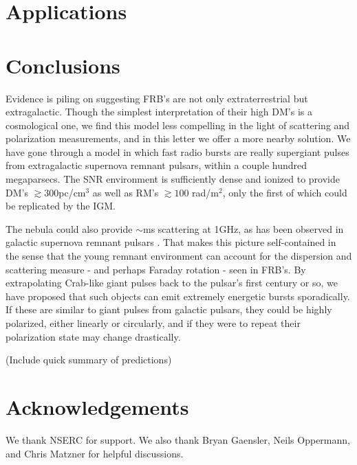 \documentclass[useAMS,usenatbib]{emulateapj}
\begin{document}
\section{Applications}

\section{Conclusions}
Evidence is piling on suggesting FRB's are not only extraterrestrial
but extragalactic. Though the simplest interpretation of their high DM's 
is a cosmological one, we find this model less compelling in the light of 
scattering and polarization measurements, and in this letter we offer a 
more nearby solution. We have gone through
a model in which fast radio bursts are really supergiant pulses from 
extragalactic supernova remnant pulsars, within a couple hundred megaparsecs. 
The SNR environment is sufficiently
dense and ionized to provide DM's $\gtrsim 300$pc/cm$^3$ as well as 
RM's $\gtrsim 100$ rad/m$^2$, only the first of which could be replicated by the IGM. 

The nebula could also provide $\sim$ms scattering at 1GHz, as has been 
observed in galactic supernova remnant pulsars \cite{}. 
That makes this picture self-contained in the sense that
the young remnant environment can account for the dispersion 
and scattering measure - and perhaps Faraday rotation - seen in FRB's. 
By extrapolating Crab-like giant pulses back to the pulsar's first century or so,
we have proposed that such objects can emit extremely energetic bursts sporadically. 
If these are similar to giant pulses from galactic pulsars, they could be highly polarized, 
either linearly or circularly, and if they were to repeat their polarization state may 
change drastically. 

(Include quick summary of predictions)

\section{Acknowledgements}

We thank NSERC for support. We also thank Bryan Gaensler, Neils Oppermann, 
and Chris Matzner for helpful discussions. 

%




\label{lastpage}
\end{document}
